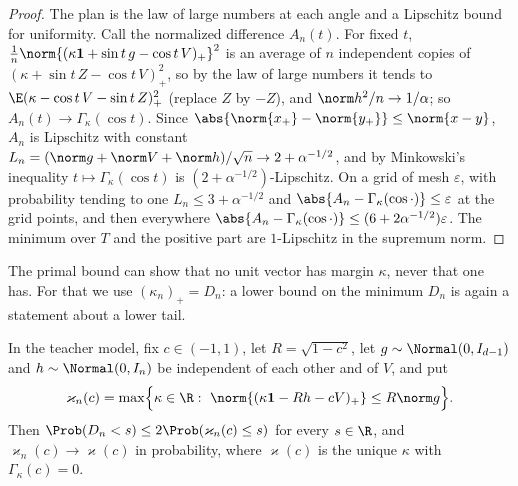\begin{refsection}
\begin{proof}
The plan is the law of large numbers at each angle and a Lipschitz bound for uniformity. Call the normalized difference $A_n(t)$. For fixed $t$, $\frac1n\norm{(\kappa\classificationones+\sin t\,g-\cos t\,V)_+}^2$ is an average of $n$ independent copies of $(\kappa+\sin t\,Z-\cos t\,V)_+^2$, so by the law of large numbers it tends to $\E(\kappa-\cos t\,V-\sin t\,Z)_+^2$ (replace $Z$ by $-Z$), and $\norm h^2/n\to1/\alpha$; so $A_n(t)\to\Gamma_\kappa(\cos t)$. Since $\abs{\norm{x_+}-\norm{y_+}}\le\norm{x-y}$, $A_n$ is Lipschitz with constant $L_n=(\norm g+\norm V+\norm h)/\sqrt n\to2+\alpha^{-1/2}$, and by Minkowski's inequality $t\mapsto\Gamma_\kappa(\cos t)$ is $(2+\alpha^{-1/2})$-Lipschitz. On a grid of mesh $\varepsilon$, with probability tending to one $L_n\le3+\alpha^{-1/2}$ and $\abs{A_n-\Gamma_\kappa(\cos\cdot)}\le\varepsilon$ at the grid points, and then everywhere $\abs{A_n-\Gamma_\kappa(\cos\cdot)}\le(6+2\alpha^{-1/2})\varepsilon$. The minimum over $T$ and the positive part are $1$-Lipschitz in the supremum norm.
\end{proof}

The primal bound can show that no unit vector has margin $\kappa$, never that one has. For that we use $(\kappa_n)_+=D_n$: a lower bound on the minimum $D_n$ is again a statement about a lower tail.

\begin{lemma}\label{lem:classification:dual}
In the teacher model, fix $c\in(-1,1)$, let $R=\sqrt{1-c^2}$, let $g\sim\Normal(0,I_{d-1})$ and $h\sim\Normal(0,I_n)$ be independent of each other and of $V$, and put
\[
\varkappa_n(c)=\max\Bigl\{\kappa\in\R:\ \norm{(\kappa\classificationones-Rh-cV)_+}\le R\norm g\Bigr\}.
\]
Then $\Prob(D_n<s)\le2\Prob(\varkappa_n(c)\le s)$ for every $s\in\R$, and $\varkappa_n(c)\to\varkappa(c)$ in probability, where $\varkappa(c)$ is the unique $\kappa$ with $\Gamma_\kappa(c)=0$.
\end{lemma}


\end{refsection}
